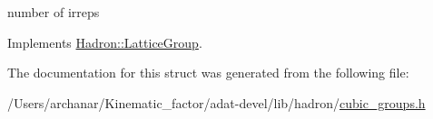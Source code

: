 number of irreps 

Implements \mbox{\hyperlink{structHadron_1_1LatticeGroup_a3edaca488144b5d2a9cf73fe653add34}{Hadron\+::\+Lattice\+Group}}.



The documentation for this struct was generated from the following file\+:\begin{DoxyCompactItemize}
\item 
/\+Users/archanar/\+Kinematic\+\_\+factor/adat-\/devel/lib/hadron/\mbox{\hyperlink{adat-devel_2lib_2hadron_2cubic__groups_8h}{cubic\+\_\+groups.\+h}}\end{DoxyCompactItemize}
